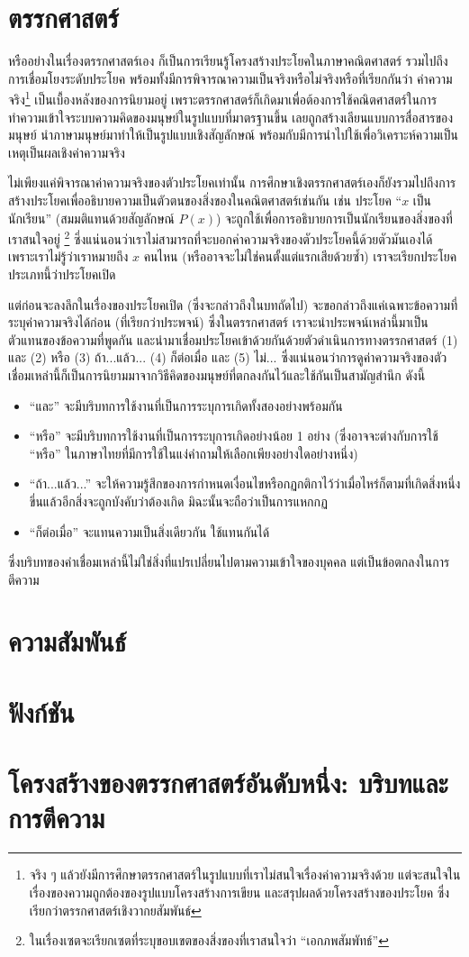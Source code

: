 \section{ตรรกศาสตร์}
หรืออย่างในเรื่องตรรกศาสตร์เอง ก็เป็นการเรียนรู้โครงสร้างประโยคในภาษาคณิตศาสตร์ รวมไปถึงการเชื่อมโยงระดับประโยค พร้อมทั้งมีการพิจารณาความเป็นจริงหรือไม่จริงหรือที่เรียกกันว่า ค่าความจริง\footnote{จริง ๆ แล้วยังมีการศึกษาตรรกศาสตร์ในรูปแบบที่เราไม่สนใจเรื่องค่าความจริงด้วย แต่จะสนใจในเรื่องของความถูกต้องของรูปแบบโครงสร้างการเขียน และสรุปผลด้วยโครงสร้างของประโยค ซึ่งเรียกว่าตรรกศาสตร์เชิงวากยสัมพันธ์} เป็นเบื้องหลังของการนิยามอยู่ เพราะตรรกศาสตร์ก็เกิดมาเพื่อต้องการใช้คณิตศาสตร์ในการทำความเข้าใจระบบความคิดของมนุษย์ในรูปแบบที่มาตรฐานขึ้น เลยถูกสร้างเลียนแบบการสื่อสารของมนุษย์ นำภาษามนุษย์มาทำให้เป็นรูปแบบเชิงสัญลักษณ์ พร้อมกับมีการนำไปใช้เพื่อวิเคราะห์ความเป็นเหตุเป็นผลเชิงค่าความจริง

ไม่เพียงแค่พิจารณาค่าความจริงของตัวประโยคเท่านั้น การศึกษาเชิงตรรกศาสตร์เองก็ยังรวมไปถึงการสร้างประโยคเพื่ออธิบายความเป็นตัวตนของสิ่งของในคณิตศาสตร์เช่นกัน เช่น ประโยค ``$x$ เป็นนักเรียน'' (สมมติแทนด้วยสัญลักษณ์ $P(x)$) จะถูกใช้เพื่อการอธิบายการเป็นนักเรียนของสิ่งของที่เราสนใจอยู่ \footnote{ในเรื่องเซตจะเรียกเซตที่ระบุขอบเขตของสิ่งของที่เราสนใจว่า ``เอกภพสัมพัทธ์''} ซึ่งแน่นอนว่าเราไม่สามารถที่จะบอกค่าความจริงของตัวประโยคนี้ด้วยตัวมันเองได้ เพราะเราไม่รู้ว่าเราหมายถึง $x$ คนไหน (หรืออาจจะไม่ใช่คนตั้งแต่แรกเสียด้วยซ้ำ) เราจะเรียกประโยคประเภทนี้ว่าประโยคเปิด

แต่ก่อนจะลงลึกในเรื่องของประโยคเปิด (ซึ่งจะกล่าวถึงในบทถัดไป) จะขอกล่าวถึงแค่เฉพาะข้อความที่ระบุค่าความจริงได้ก่อน (ที่เรียกว่าประพจน์) ซึ่งในตรรกศาสตร์ เราจะนำประพจน์เหล่านี้มาเป็นตัวแทนของข้อความที่พูดกัน และนำมาเชื่อมประโยคเข้าด้วยกันด้วยตัวดำเนินการทางตรรกศาสตร์ (1) และ (2) หรือ (3) ถ้า...แล้ว... (4) ก็ต่อเมื่อ และ (5) ไม่... ซึ่งแน่นอนว่าการดูค่าความจริงของตัวเชื่อมเหล่านี้ก็เป็นการนิยามมาจากวิธีคิดของมนุษย์ที่ตกลงกันไว้และใช้กันเป็นสามัญสำนึก ดังนี้
\begin{itemize}
	\item ``และ'' จะมีบริบทการใช้งานที่เป็นการระบุการเกิดทั้งสองอย่างพร้อมกัน
	\item ``หรือ'' จะมีบริบทการใช้งานที่เป็นการระบุการเกิดอย่างน้อย 1 อย่าง (ซึ่งอาจจะต่างกับการใช้ ``หรือ'' ในภาษาไทยที่มีการใช้ในแง่คำถามให้เลือกเพียงอย่างใดอย่างหนึ่ง)
	\item ``ถ้า...แล้ว...'' จะให้ความรู้สึกของการกำหนดเงื่อนไขหรือกฏกติกาไว้ว่าเมื่อไหร่ก็ตามที่เกิดสิ่งหนึ่งขึ่นแล้วอีกสิ่งจะถูกบังคับว่าต้องเกิด มิฉะนั้นจะถือว่าเป็นการแหกกฏ
	\item ``ก็ต่อเมื่อ'' จะแทนความเป็นสิ่งเดียวกัน ใช้แทนกันได้
\end{itemize}
ซึ่งบริบทของคำเชื่อมเหล่านี้ไม่ใช่สิ่งที่แปรเปลี่ยนไปตามความเข้าใจของบุคคล แต่เป็นข้อตกลงในการตีความ
\section{ความสัมพันธ์}

\section{ฟังก์ชัน}

\section{โครงสร้างของตรรกศาสตร์อันดับหนึ่ง: บริบทและการตีความ}